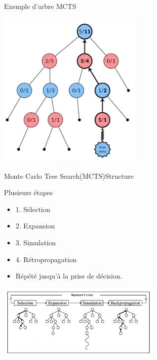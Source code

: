 \begin{frame}
	\begin{block}{Exemple d'arbre MCTS}
		\begin{center}
			\includegraphics[width=7cm]{ressources/MCTS/tree.png}
		\end{center}
	\end{block}
\end{frame}


\begin{frame}{Monte Carlo Tree Search(MCTS)}{Structure}
	\begin{block}{Plusieurs étapes}
		\begin{itemize}
			\item 1. Sélection
			\item 2. Expansion
			\item 3. Simulation
			\item 4. Rétropropagation
			\item Répété jusqu'à la prise de décision.
		\end{itemize}
		\begin{center}
			\includegraphics[width=8cm]{ressources/MCTS/MCTSEtapes}
		\end{center}
	\end{block}
\end{frame}

